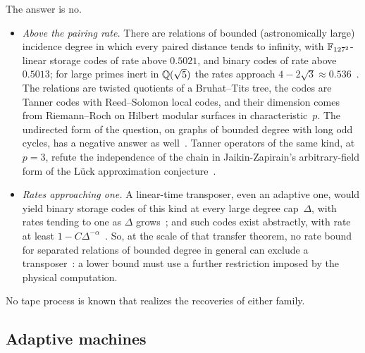 The answer is no.
\begin{itemize}[leftmargin=1.5em]
\item \emph{Above the pairing rate.} There are relations of bounded (astronomically large) incidence degree in which
every paired distance tends to infinity, with $\mathbb{F}_{127^2}$-linear storage codes of rate above $0.5021$, and binary
codes of rate above $0.5013$; for large primes inert in $\mathbb{Q}(\sqrt5)$ the rates approach
$4-2\sqrt3\approx0.536$~\cite[Theorems~7.1 and~7.3, Corollary~8.2]{StorageCodes2026}. The relations are twisted
quotients of a Bruhat--Tits tree, the codes are Tanner codes with Reed--Solomon local codes, and their dimension comes
from Riemann--Roch on Hilbert modular surfaces in characteristic~$p$. The undirected form of the question, on graphs of
bounded degree with long odd cycles, has a negative answer as well~\cite[Corollary~9.3]{StorageCodes2026}. Tanner operators of the same
kind, at $p=3$, refute the independence of the chain in Jaikin-Zapirain's arbitrary-field form of the L\"uck
approximation conjecture~\cite[Theorem~5.6]{Luck2026}.
\item \emph{Rates approaching one.} A linear-time transposer, even an adaptive one, would yield binary storage codes
of this kind at every large degree cap~$\Delta$, with rates tending to one as $\Delta$
grows~\cite[Theorem~3.1]{HighRate2026}; and such codes exist abstractly, with rate at least
$1-C\Delta^{-\alpha}$~\cite[Theorem~5.5]{HighRate2026}. So, at the scale of that transfer theorem, no rate bound for
separated relations of bounded degree in general can exclude a transposer~\cite[Corollary~6.2]{HighRate2026}: a lower
bound must use a further restriction imposed by the physical computation.
\end{itemize}
No tape process is known that realizes the recoveries of either family.

\subsection{Adaptive machines}\label{sec:adaptive}

